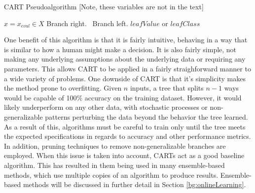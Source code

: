 	\begin{algorithm}[ht]
		\caption{CART Pseudoalgorithm [Note, these variables are not in the text] }
		\label{code:bg_cart}
		\begin{algorithmic}[1]
			\State $x = x_{eval} \in X$
			 Branch right.
			\Else \ Branch left.
			\EndIf
			\EndWhile
			\State \Return $leafValue$ or $leafClass$
			\EndProcedure
		\end{algorithmic}
	\end{algorithm}

	\par One benefit of this algorithm is that it is fairly intuitive, behaving in a way that is similar to how a human might make a decision. It is also fairly simple, not making any underlying assumptions about the underlying data or requiring any parameters. This allows CART to be applied in a fairly straighforward manner to a wide variety of problems. One downside of CART is that it's simplicity makes the method prone to overfitting. Given $n$ inputs, a tree that splits $n-1$ ways would be capable of 100\% accuracy on the training dataset. However, it would likely underperform on any other data, with stochastic processes or non-generalizable patterns perturbing the data beyond the behavior the tree learned. As a result of this, algorithms must be careful to train only until the tree meets the expected specifications in regards to accuracy and other performance metrics. In addition, pruning techniques to remove non-generalizable branches are employed. When this issue is taken into account, CARTs act as a good baseline algorithm. This has resulted in them being used in many ensemble-based methods, which use multiple copies of an algorithm to produce results. Ensemble-based methods will be discussed in further detail in Section \ref{bg:onlineLearning}.
	
